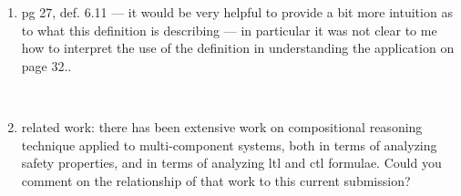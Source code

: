 \begin{enumerate}
~


~

\item pg 27, def. 6.11 --- it would be very helpful to provide a bit more
intuition as to what this definition is describing --- in particular it was not
clear to me how to interpret the use of the definition in understanding the
application on page 32..

~


\item  related work: there has been extensive work on compositional reasoning
technique applied to multi-component systems, both in terms of analyzing
safety properties, and in terms of analyzing ltl and ctl formulae. 
Could you comment
on the relationship of that work to this current submission?

~


\end{enumerate}



